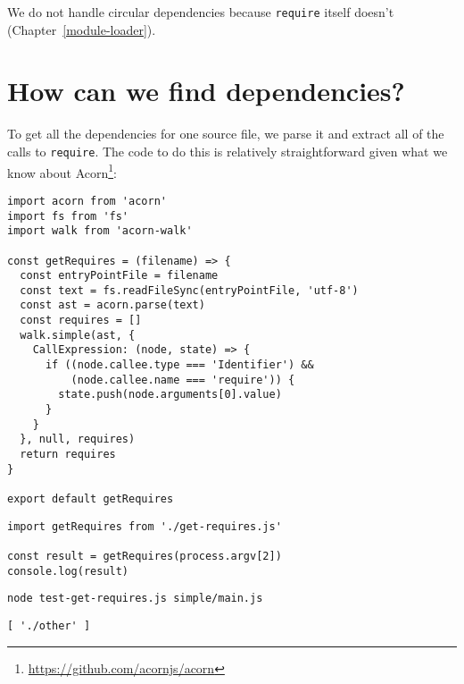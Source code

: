 \documentclass[krantzl]{krantz}
\newcommand{\chapref}[1]{Chapter~\ref{#1}}
\newcommand{\hreffoot}[2]{{#1}\footnote{\href{#2}{#2}}}
\begin{document}
We do not handle circular dependencies
because \texttt{require} itself doesn't (\chapref{module-loader}).

\section{How can we find dependencies?}\label{module-bundler-find}


To get all the dependencies for one source file,
we parse it and extract all of the calls to \texttt{require}.
The code to do this is relatively straightforward given what we know about \hreffoot{Acorn}{https://github.com/acornjs/acorn}:


\begin{lstlisting}[frame=single,frameround=tttt]
import acorn from 'acorn'
import fs from 'fs'
import walk from 'acorn-walk'

const getRequires = (filename) => {
  const entryPointFile = filename
  const text = fs.readFileSync(entryPointFile, 'utf-8')
  const ast = acorn.parse(text)
  const requires = []
  walk.simple(ast, {
    CallExpression: (node, state) => {
      if ((node.callee.type === 'Identifier') &&
          (node.callee.name === 'require')) {
        state.push(node.arguments[0].value)
      }
    }
  }, null, requires)
  return requires
}

export default getRequires
\end{lstlisting}



\begin{lstlisting}[frame=single,frameround=tttt]
import getRequires from './get-requires.js'

const result = getRequires(process.argv[2])
console.log(result)
\end{lstlisting}



\begin{lstlisting}[frame=single,frameround=tttt]
node test-get-requires.js simple/main.js
\end{lstlisting}



\begin{lstlisting}[frame=single,frameround=tttt]
[ './other' ]
\end{lstlisting}
\end{document}
